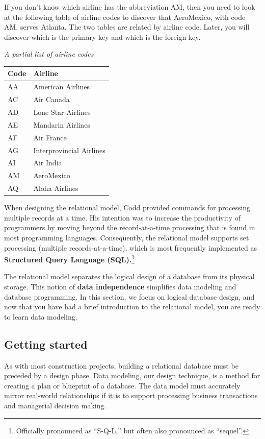 \documentclass[
]{article}
\begin{document}
If you don't know which airline has the abbreviation AM, then you need to look at the following table of airline codes to discover that AeroMexico, with code AM, serves Atlanta. The two tables are related by airline code. Later, you will discover which is the primary key and which is the foreign key.

\emph{A partial list of airline codes}

\begin{longtable}[]{@{}ll@{}}
\toprule
Code & Airline \\
\midrule
\endhead
AA & American Airlines \\
AC & Air Canada \\
AD & Lone Star Airlines \\
AE & Mandarin Airlines \\
AF & Air France \\
AG & Interprovincial Airlines \\
AI & Air India \\
AM & AeroMexico \\
AQ & Aloha Airlines \\
\bottomrule
\end{longtable}

When designing the relational model, Codd provided commands for processing multiple records at a time. His intention was to increase the productivity of programmers by moving beyond the record-at-a-time processing that is found in most programming languages. Consequently, the relational model supports set processing (multiple records-at-a-time), which is most frequently implemented as \textbf{Structured Query Language (SQL).}\footnote{Officially pronounced as ``S-Q-L,'' but often also pronounced as ``sequel''.}

The relational model separates the logical design of a database from its physical storage. This notion of \textbf{data independence} simplifies data modeling and database programming. In this section, we focus on logical database design, and now that you have had a brief introduction to the relational model, you are ready to learn data modeling.

\hypertarget{getting-started}{%
\subsection*{Getting started}\label{getting-started}}

As with most construction projects, building a relational database must be preceded by a design phase. Data modeling, our design technique, is a method for creating a plan or blueprint of a database. The data model must accurately mirror real-world relationships if it is to support processing business transactions and managerial decision making.
\end{document}
